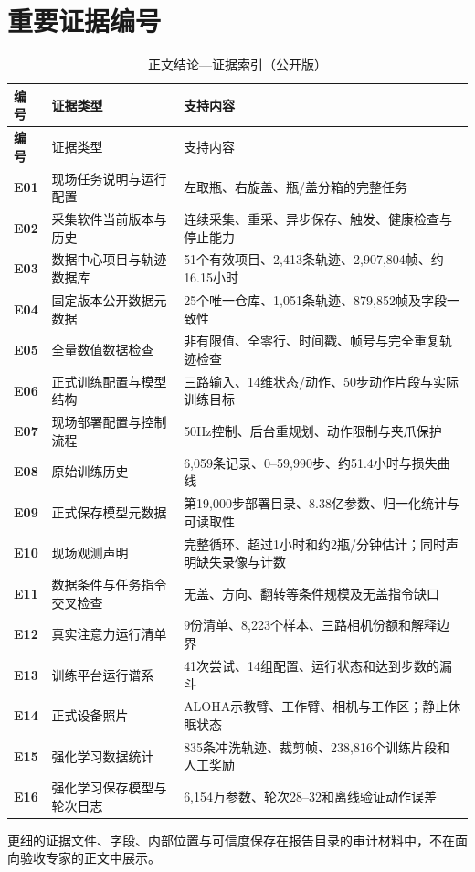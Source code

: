 \section{重要证据编号}

\begin{longtable}{>{\bfseries}p{17mm}p{43mm}p{70mm}}
\caption{正文结论—证据索引（公开版）}\\
\toprule
编号 & 证据类型 & 支持内容\\
\midrule\endfirsthead
\toprule
编号 & 证据类型 & 支持内容\\
\midrule\endhead
E01 & 现场任务说明与运行配置 & 左取瓶、右旋盖、瓶/盖分箱的完整任务\\
E02 & 采集软件当前版本与历史 & 连续采集、重采、异步保存、触发、健康检查与停止能力\\
E03 & 数据中心项目与轨迹数据库 & 51个有效项目、2,413条轨迹、2,907,804帧、约16.15小时\\
E04 & 固定版本公开数据元数据 & 25个唯一仓库、1,051条轨迹、879,852帧及字段一致性\\
E05 & 全量数值数据检查 & 非有限值、全零行、时间戳、帧号与完全重复轨迹检查\\
E06 & 正式训练配置与模型结构 & 三路输入、14维状态/动作、50步动作片段与实际训练目标\\
E07 & 现场部署配置与控制流程 & 50Hz控制、后台重规划、动作限制与夹爪保护\\
E08 & 原始训练历史 & 6,059条记录、0--59,990步、约51.4小时与损失曲线\\
E09 & 正式保存模型元数据 & 第19,000步部署目录、8.38亿参数、归一化统计与可读取性\\
E10 & 现场观测声明 & 完整循环、超过1小时和约2瓶/分钟估计；同时声明缺失录像与计数\\
E11 & 数据条件与任务指令交叉检查 & 无盖、方向、翻转等条件规模及无盖指令缺口\\
E12 & 真实注意力运行清单 & 9份清单、8,223个样本、三路相机份额和解释边界\\
E13 & 训练平台运行谱系 & 41次尝试、14组配置、运行状态和达到步数的漏斗\\
E14 & 正式设备照片 & ALOHA示教臂、工作臂、相机与工作区；静止休眠状态\\
E15 & 强化学习数据统计 & 835条冲洗轨迹、裁剪帧、238,816个训练片段和人工奖励\\
E16 & 强化学习保存模型与轮次日志 & 6,154万参数、轮次28--32和离线验证动作误差\\
\bottomrule
\end{longtable}

更细的证据文件、字段、内部位置与可信度保存在报告目录的审计材料中，不在面向验收专家的正文中展示。


